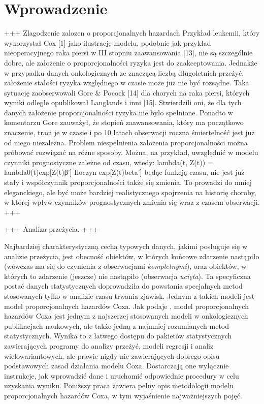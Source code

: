 \chapter*{Wprowadzenie}


+++
Zlagodzenie zalozen o proporcjonalnych hazardach
Przykład leukemii, który wykorzystał Cox [1] jako ilustrację
modelu, podobnie jak przykład nieoperacyjnego raka
piersi w III stopniu zaawansowania [13], nie są szczególnie
dobre, ale założenie o proporcjonalności ryzyka
jest do zaakceptowania. Jednakże w przypadku danych
onkologicznych ze znaczącą liczbą długoletnich przeżyć,
założenie stałości ryzyka względnego w czasie może już
nie być rozsądne. Taka sytuację zaobserwowali Gore \&
Pocock [14] dla chorych na raka piersi, których wyniki
odległe opublikował Langlands i inni [15]. Stwierdzili
oni, że dla tych danych założenie proporcjonalności ryzyka
nie było spełnione. Ponadto w komentarzu Gore
zauważył, że stopień zaawansowania, który ma początkowo
znaczenie, traci je w czasie i po 10 latach obserwacji
roczna śmiertelność jest już od niego niezależna.
Problem niespełnienia założenia proporcjonalności
można próbować rozwiązać na różne sposoby. Można, na
przykład, uwzględnić w modelu czynniki prognostyczne
zależne od czasu, wtedy:
lambda(t, Z(t)) = lambda0(t)exp[Z(t)β']
Iloczyn exp[Z(t)beta'] będąc funkcją czasu, nie jest już
stały i współczynnik proporcjonalności także się zmienia.
To prowadzi do mniej eleganckiego, ale być może
bardziej realistycznego spojrzenia na historię choroby,
w której wpływ czynników prognostycznych zmienia się
wraz z czasem obserwacji.
+++

+++
Analiza przeżycia.
+++

Najbardziej charakterystyczną cechą typowych danych, jakimi posługuje się w analizie przeżycia, jest obecność obiektów, w których końcowe zdarzenie nastąpiło (wówczas ma się do czynienia z obserwacjami \textit{kompletnymi}), oraz obiektów, w których to zdarzenie (jeszcze) nie nastąpiło (obserwacja \textit{ucięta}). Ta specyficzna postać danych statystycznych doprowadziła do powstania specjalnych metod stosowanych tylko w analizie czasu trwania zjawisk. Jednym z takich modeli jest model proporcjonalnych hazardów Coxa. Jak podaje \cite{assel}, model proporcjonalnych hazardów Coxa jest jednym z najszerzej stosowanych modeli w onkologicznych publikacjach naukowych, ale także jedną z najmniej rozumianych metod statystycznych. Wynika to z łatwego dostępu do pakietów statystycznych zawierających programy do analizy przeżyć, modeli regresji i analiz wielowariantowych, ale prawie nigdy nie zawierających dobrego opisu podstawowych zasad działania modelu Coxa. Dostarczają one wyłącznie instrukcje, jak wprowadzić dane i uruchomić odpowiednie procedury w celu uzyskania wyniku. Poniższy praca zawiera pełny opis metodologii modelu proporcjonalnych hazardów Coxa, w tym wyjaśnienie najważniejszych pojęć.


